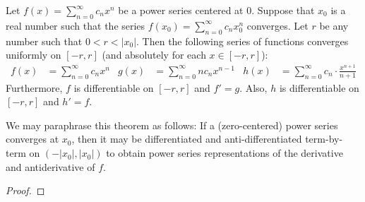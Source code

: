 \documentclass[../main.tex]{subfiles}
\begin{document}
\begin{theorem}\label{trm:17.13}
    Let $f(x)=\sum_{n=0}^\infty c_nx^n$ be a power series centered at 0. Suppose that $x_0$ is a real number such that the series $f(x_0)=\sum_{n=0}^\infty c_nx_0^n$ converges. Let $r$ be any number such that $0<r<|x_0|$. Then the following series of functions converges uniformly on $[-r,r]$ (and absolutely for each $x\in[-r,r]$):
    \begin{align*}
        f(x) &= \sum_{n=0}^\infty c_nx^n&
        g(x) &= \sum_{n=0}^\infty nc_nx^{n-1}&
        h(x) &= \sum_{n=0}^\infty c_n\cdot\frac{x^{n+1}}{n+1}
    \end{align*}
    Furthermore, $f$ is differentiable on $[-r,r]$ and $f'=g$. Also, $h$ is differentiable on $[-r,r]$ and $h'=f$.\par
    We may paraphrase this theorem as follows: If a (zero-centered) power series converges at $x_0$, then it may be differentiated and anti-differentiated term-by-term on $(-|x_0|,|x_0|)$ to obtain power series representations of the derivative and antiderivative of $f$.
    \begin{proof}


\end{proof}
\end{theorem}
\end{document}
